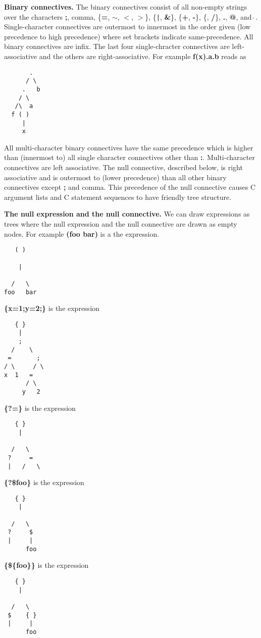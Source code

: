 \documentclass{article}
\newcommand{\mtt}[1]{\mbox{\tt #1}}
\begin{document}
{\bf Binary connectives.} The binary connectives consist of all non-empty strings over the characters {\bf ;}, comma, \{{\bf =}, {\bf $\sim$}, {\bf $<$}, {\bf $>$}\}, \{\mtt{|}, {\bf \&}\}, \{{\bf +},
{\bf -}\}, \{{\bf *}, {\bf /}\}, {\bf .}, {\bf @}, and \mtt{$\hat{~}$}.
Single-character connectives are outermost to innermost in the order given (low
precedence to high precedence) where set brackets indicate same-precedence.    All binary connectives are infix.  The last four single-chracter connectives are left-associative and the
others are right-associative. For example {\bf f(x).a.b} reads as
\begin{verbatim}
       .   
      / \
     .   b
    / \
   /\  a
  f ( )
     |
     x
\end{verbatim}
All multi-character binary connectives have the same
precedence which is higher than (innermost to) all single character connectives other than {\bf :}.
Multi-character connectives are left associative.  The null connective, described below, is right associative and is outermost to (lower precedence) than all other binary connectives
except {\bf;} and comma.  This precedence of the null connective causes C argument lists and C statement sequences to have friendly tree structure.

{\bf The null expression and the null connective.}  We can draw expressions as trees where the null expression and the null connective are drawn as empty nodes.
For example {\bf (foo bar)} is a the expression.
\begin{verbatim}
   ( )

    |
      
  /   \
foo   bar
\end{verbatim}
  
{\bf \{x=1;y=2;\}} is the expression
\begin{verbatim}
   { }
    |
    ;   
  /    \
 =       ;
/ \     / \
x  1   =
      / \
     y   2
\end{verbatim}
{\bf \{?=\}} is  the expression
\begin{verbatim}
   { }
    |

  /   \
 ?     =
 |   /   \
\end{verbatim}

{\bf \{?\$foo\}} is  the expression
\begin{verbatim}
   { }
    |

  /   \
 ?     $
 |     |
      foo
\end{verbatim}

{\bf \{\$\{foo\}\}} is  the expression
\begin{verbatim}
   { }
    |

  /   \
 $    { }
 |     |
      foo
\end{verbatim}
\end{document}
